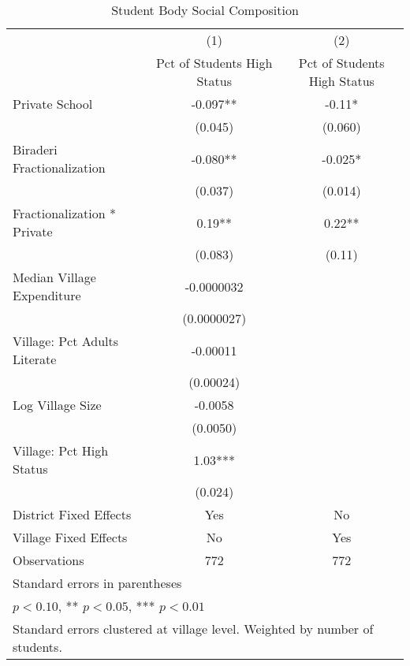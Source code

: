 \begin{table}[htbp]\centering
\def\sym#1{\ifmmode^{#1}\else\(^{#1}\)\fi}
\caption{Student Body Social Composition\label{highpooling}}
\begin{tabular}{l*{2}{c}}
\toprule
                &\multicolumn{1}{c}{(1)}&\multicolumn{1}{c}{(2)}\\
                &\multicolumn{1}{c}{Pct of Students High Status}&\multicolumn{1}{c}{Pct of Students High Status}\\
\midrule
Private School  &   -0.097** &    -0.11*  \\
                &  (0.045)   &  (0.060)   \\
Biraderi Fractionalization&   -0.080** &   -0.025*  \\
                &  (0.037)   &  (0.014)   \\
Fractionalization * Private&     0.19** &     0.22** \\
                &  (0.083)   &   (0.11)   \\
Median Village Expenditure&-0.0000032   &            \\
                &(0.0000027)   &            \\
Village: Pct Adults Literate& -0.00011   &            \\
                &(0.00024)   &            \\
Log Village Size&  -0.0058   &            \\
                & (0.0050)   &            \\
Village: Pct High Status&     1.03***&            \\
                &  (0.024)   &            \\
District Fixed Effects&      Yes   &       No   \\
Village Fixed Effects&       No   &      Yes   \\
\midrule
Observations    &      772   &      772   \\
\bottomrule
\multicolumn{3}{l}{\footnotesize Standard errors in parentheses}\\
\multicolumn{3}{l}{\footnotesize * \(p<0.10\), ** \(p<0.05\), *** \(p<0.01\)}\\
\multicolumn{3}{l}{\footnotesize Standard errors clustered at village level. Weighted by number of students.}\\
\end{tabular}
\end{table}
